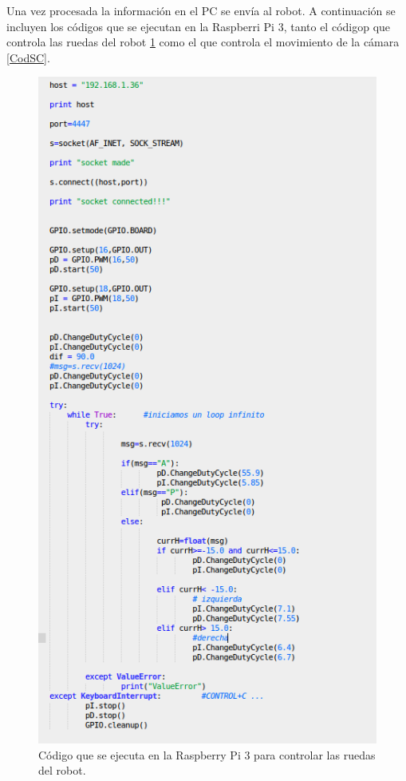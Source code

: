 \documentclass[twoside, 11pt]{epstfg}
\begin{document}
Una vez procesada la información en el PC se envía al robot. A continuación se incluyen los códigos que se ejecutan en la Raspberri Pi 3, tanto el códigop que controla las ruedas del robot \ref{CodSH} como el que controla el movimiento de la cámara \ref{CodSC}.
\begin{figure}[H]
	\centerline{
		\mbox{\includegraphics[width=.70\textwidth]{images/CodigosocketH.png}}
	}
	\caption{Código que se ejecuta en la Raspberry Pi 3 para controlar las ruedas del robot.}
	\label{CodSH}
\end{figure}
\end{document}
